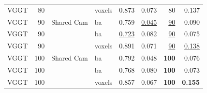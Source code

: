 \begin{table}[H]
\begin{tabular}{lrllrrrr}
VGGT & 80 &  & voxels & 0.873 & 0.073 & 80 & 0.137 \\
VGGT & 90 & Shared Cam & ba & 0.759 & \underline{0.045} & \underline{90} & 0.090 \\
VGGT & 90 &  & ba & \underline{0.723} & 0.082 & \underline{90} & 0.075 \\
VGGT & 90 &  & voxels & 0.891 & 0.071 & \underline{90} & \underline{0.138} \\
VGGT & 100 & Shared Cam & ba & 0.792 & 0.048 & \textbf{100} & 0.076 \\
VGGT & 100 &  & ba & 0.768 & 0.080 & \textbf{100} & 0.073 \\
VGGT & 100 &  & voxels & 0.857 & 0.067 & \textbf{100} & \textbf{0.155} \\
\bottomrule
\end{tabular}
\end{table}

